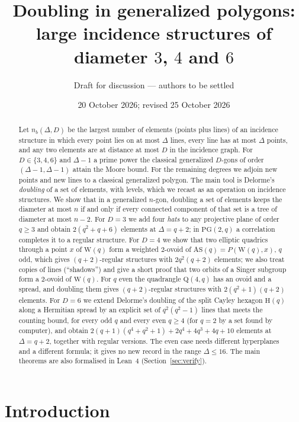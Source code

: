 \documentclass[11pt]{amsart}
\title[Doubling in generalized polygons]{Doubling in generalized polygons:\\ large incidence structures of diameter $3$, $4$ and $6$}
\author{Draft for discussion --- authors to be settled}
\date{20 October 2026; revised 25 October 2026}
\theoremstyle{definition}
\theoremstyle{remark}
\newcommand{\PG}{\mathrm{PG}}
\newcommand{\Hq}{\mathrm{H}}
\newcommand{\AS}{\mathrm{AS}}
\newcommand{\Wq}{\mathrm{W}}
\newcommand{\Qf}{\mathrm{Q}}
\begin{document}
\begin{abstract}
Let $n_b(\Delta,D)$ be the largest number of elements (points plus lines) of an incidence structure in which every point lies on at most $\Delta$ lines, every line has at most $\Delta$ points, and any two elements are at distance at most $D$ in the incidence graph. For $D\in\{3,4,6\}$ and $\Delta-1$ a prime power the classical generalized $D$-gons of order $(\Delta-1,\Delta-1)$ attain the Moore bound. For the remaining degrees we adjoin new points and new lines to a classical generalized polygon. The main tool is Delorme's \emph{doubling} of a set of elements, with levels, which we recast as an operation on incidence structures. We show that in a generalized $n$-gon, doubling a set of elements keeps the diameter at most $n$ if and only if every connected component of that set is a tree of diameter at most $n-2$.
For $D=3$ we add four \emph{hats} to any projective plane of order $q\ge 3$ and obtain $2(q^2+q+6)$ elements at $\Delta=q+2$; in $\PG(2,q)$ a correlation completes it to a regular structure.
For $D=4$ we show that two elliptic quadrics through a point $x$ of $\Wq(q)$ form a weighted $2$-ovoid of $\AS(q)=P(\Wq(q),x)$, $q$ odd, which gives $(q+2)$-regular structures with $2q^2(q+2)$ elements; we also treat copies of lines (``shadows'') and give a short proof that two orbits of a Singer subgroup form a $2$-ovoid of $\Wq(q)$. For $q$ even the quadrangle $\Qf(4,q)$ has an ovoid and a spread, and doubling them gives $(q+2)$-regular structures with $2(q^2+1)(q+2)$ elements.
For $D=6$ we extend Delorme's doubling of the split Cayley hexagon $\Hq(q)$ along a Hermitian spread by an explicit set of $q^2(q^2-1)$ lines that meets the counting bound, for every odd $q$ and every even $q\ge4$ (for $q=2$ by a set found by computer), and obtain $2(q+1)(q^4+q^2+1)+2q^4+4q^3+4q+10$ elements at $\Delta=q+2$, together with regular versions. The even case needs different hyperplanes and a different formula; it gives no new record in the range $\Delta\le16$. The main theorems are also formalised in Lean~4 (Section~\ref{sec:verify}).
\end{abstract}

\maketitle

\section{Introduction}\label{sec:intro}
\end{document}
